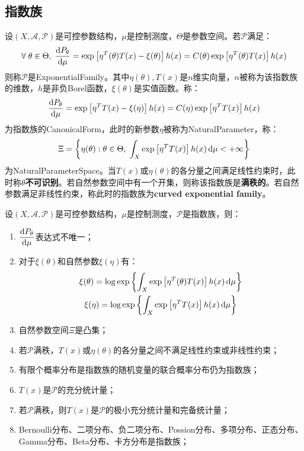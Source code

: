 \subsection{指数族}
\begin{definition}
	设$(X,\mathscr{A},\mathscr{P})$是可控参数结构，$\mu$是控制测度，$\Theta$是参数空间。若$\mathscr{P}$满足：
	\begin{equation*}
		\forall\;\theta\in\Theta,\;\frac{\mathop{}\!\mathrm{d} P_{\theta}}{\mathop{}\!\mathrm{d}\mu}=\exp\left[\eta^T(\theta)T(x)-\xi(\theta)\right]h(x)=C(\theta)\exp\left[\eta^T(\theta)T(x)\right]h(x)
	\end{equation*}
	则称$\mathscr{P}$是\gls{ExponentialFamily}。其中$\eta(\theta),T(x)$是$n$维实向量，$n$被称为该指数族的维数，$h$是非负Borel函数，$\xi(\theta)$是实值函数。称：
	\begin{equation*}
		\frac{\mathop{}\!\mathrm{d} P_{\theta}}{\mathop{}\!\mathrm{d}\mu}=\exp\left[\eta^TT(x)-\xi(\eta)\right]h(x)=C(\eta)\exp\left[\eta^TT(x)\right]h(x)
	\end{equation*}
	为指数族的\gls{CanonicalForm}，此时的新参数$\eta$被称为\gls{NaturalParameter}，称：
	\begin{equation*}
		\Xi=\left\{\eta(\theta):\theta\in\Theta,\;\int_{X}\exp\left[\eta^TT(x)\right]h(x)\mathop{}\!\mathrm{d}\mu<+\infty\right\}
	\end{equation*}
	为\gls{NaturalParameterSpace}。当$T(x)$或$\eta(\theta)$的各分量之间满足线性约束时，此时称$\theta$\textbf{不可识别}。若自然参数空间中有一个开集，则称该指数族是\textbf{满秩的}。若自然参数满足非线性约束，称此时的指数族为\textbf{curved exponential family}。
\end{definition}
\begin{property}\label{prop:ExponentialFamily}
	设$(X,\mathscr{A},\mathscr{P})$是可控参数结构，$\mu$是控制测度，$\mathscr{P}$是指数族，则：
	\begin{enumerate}
		\item $\dfrac{\mathop{}\!\mathrm{d} P_{\theta}}{\mathop{}\!\mathrm{d}\mu}$表达式不唯一；
		\item 对于$\xi(\theta)$和自然参数$\xi(\eta)$有：
		\begin{gather*}
			\xi(\theta)=\log\exp\left\{\int_{X}\exp\left[\eta^T(\theta)T(x)\right]h(x)\mathop{}\!\mathrm{d}\mu\right\} \\
			\xi(\eta)=\log\exp\left\{\int_{X}\exp\left[\eta^TT(x)\right]h(x)\mathop{}\!\mathrm{d}\mu\right\}
		\end{gather*}
		\item 自然参数空间$\Xi$是凸集；
		\item 若$\mathscr{P}$满秩，$T(x)$或$\eta(\theta)$的各分量之间不满足线性约束或非线性约束；
		\item 有限个概率分布是指数族的随机变量的联合概率分布仍为指数族；
		\item $T(x)$是$\mathscr{P}$的充分统计量；
		\item 若$\mathscr{P}$满秩，则$T(x)$是$\mathscr{P}$的极小充分统计量和完备统计量；
		\item Bernoulli分布、二项分布、负二项分布、Possion分布、多项分布、正态分布、Gamma分布、Beta分布、卡方分布是指数族；
	\end{enumerate}
\end{property}
